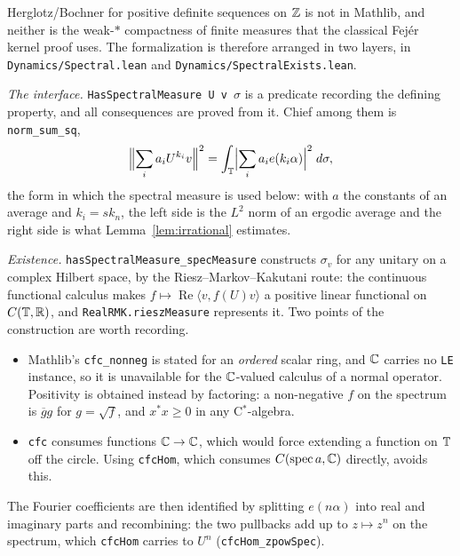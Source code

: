 \begin{remark}
  \leanok
  Herglotz/Bochner for positive definite sequences on $\mathbb{Z}$ is not in Mathlib, and neither is
  the weak-$\ast$ compactness of finite measures that the classical Fej\'er kernel proof uses.
  The formalization is therefore arranged in two layers, in
  \texttt{Dynamics/Spectral.lean} and \texttt{Dynamics/SpectralExists.lean}.

  \emph{The interface.}  \texttt{HasSpectralMeasure U v \(\sigma\)} is a predicate recording the
  defining property, and all consequences are proved from it.  Chief among them is
  \texttt{norm\_sum\_sq},
  \[
    \Bigl\lVert \sum_i a_i U ^{k_i} v \Bigr\rVert ^2
      = \int_{\mathbb{T}} \Bigl\lvert \sum_i a_i e(k_i \alpha) \Bigr\rvert ^2 \;d \sigma ,
  \]
  the form in which the spectral measure is used below: with $a$ the constants of an average
  and $k_i = s k_n$, the left side is the $L^2$ norm of an ergodic average and the right side
  is what Lemma~\ref{lem:irrational} estimates.

  \emph{Existence.}  \texttt{hasSpectralMeasure\_specMeasure} constructs $\sigma_v$ for any
  unitary on a complex Hilbert space, by the Riesz--Markov--Kakutani route: the continuous
  functional calculus makes $f \mapsto \operatorname{Re}\langle v, f(U)v\rangle$ a positive
  linear functional on $C(\mathbb{T},\mathbb{R})$, and \texttt{RealRMK.rieszMeasure} represents it.  Two
  points of the construction are worth recording.
  \begin{itemize}
    \item Mathlib's \texttt{cfc\_nonneg} is stated for an \emph{ordered} scalar ring, and $\mathbb{C}$
      carries no \texttt{LE} instance, so it is unavailable for the $\mathbb{C}$-valued calculus of a
      normal operator.  Positivity is obtained instead by factoring: a non-negative $f$ on the
      spectrum is $\overline g g$ for $g = \sqrt f$, and $x^\ast x \geq 0$ in any
      C$^\ast$-algebra.
    \item \texttt{cfc} consumes functions $\mathbb{C} \to \mathbb{C}$, which would force extending a function
      on $\mathbb{T}$ off the circle.  Using \texttt{cfcHom}, which consumes
      $C(\operatorname{spec} a, \mathbb{C})$ directly, avoids this.
  \end{itemize}
  The Fourier coefficients are then identified by splitting $e(n\alpha)$ into real and
  imaginary parts and recombining: the two pullbacks add up to $z \mapsto z^n$ on the spectrum,
  which \texttt{cfcHom} carries to $U^n$ (\texttt{cfcHom\_zpowSpec}).
\end{remark}

